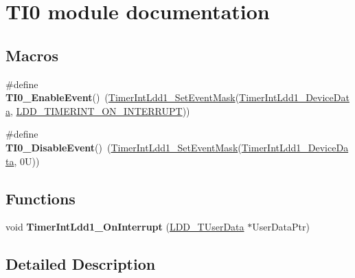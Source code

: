 \hypertarget{group___t_i0__module}{}\section{T\+I0 module documentation}
\label{group___t_i0__module}
\subsection*{Macros}
\begin{DoxyCompactItemize}
\item 
\mbox{\label{group___t_i0__module_ga900c425b24e552e4f33db3d2a16e32d2}} 
\#define {\bfseries T\+I0\+\_\+\+Enable\+Event}()~(\hyperlink{group___timer_int_ldd1__module_gaf99e15010d993ffdbc1d2eb08d4d229d}{Timer\+Int\+Ldd1\+\_\+\+Set\+Event\+Mask}(\hyperlink{group___timer_int_ldd1__module_ga5029b1a3ee62b1e77252cb5ee432e572}{Timer\+Int\+Ldd1\+\_\+\+Device\+Data}, \hyperlink{group___p_e___types__module_gad4a95a8e3f3036e88f99c792431b4d72}{L\+D\+D\+\_\+\+T\+I\+M\+E\+R\+I\+N\+T\+\_\+\+O\+N\+\_\+\+I\+N\+T\+E\+R\+R\+U\+PT}))
\item 
\mbox{\label{group___t_i0__module_ga19f22fc674870dcb660a2ba996584baa}} 
\#define {\bfseries T\+I0\+\_\+\+Disable\+Event}()~(\hyperlink{group___timer_int_ldd1__module_gaf99e15010d993ffdbc1d2eb08d4d229d}{Timer\+Int\+Ldd1\+\_\+\+Set\+Event\+Mask}(\hyperlink{group___timer_int_ldd1__module_ga5029b1a3ee62b1e77252cb5ee432e572}{Timer\+Int\+Ldd1\+\_\+\+Device\+Data}, 0\+U))
\end{DoxyCompactItemize}
\subsection*{Functions}
\begin{DoxyCompactItemize}
\item 
\mbox{\label{group___t_i0__module_ga54442f7694fc9c73818c8e5985597415}} 
void {\bfseries Timer\+Int\+Ldd1\+\_\+\+On\+Interrupt} (\hyperlink{group___p_e___types__module_ga0b66a73f87238a782318aa0be7578e35}{L\+D\+D\+\_\+\+T\+User\+Data} $\ast$User\+Data\+Ptr)
\end{DoxyCompactItemize}


\subsection{Detailed Description}
